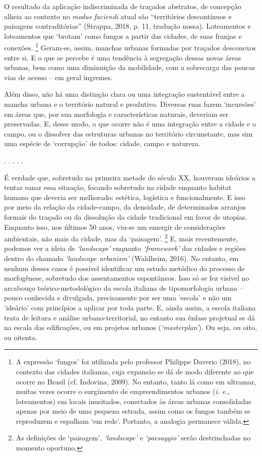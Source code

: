 \documentclass[]{report}
\begin{document}
	O resultado da aplicação indiscriminada de traçados abstratos, de concepção alheia ao contexto no \textit{modus faciendi} atual são ``territórios descontínuos e paisagens contraditórias'' (Strappa, 2018, p. 11, tradução nossa). Loteamentos e loteamentos que `brotam' como fungos a partir das cidades, de suas franjas e conexões.
		\footnote[5]{A expressão `fungos' foi utilizada pelo professor Philippe Daverio (2018), no contexto das cidades italianas, cuja expansão se dá de modo diferente ao que ocorre no Brasil (cf. Indovina, 2009). No entanto, tanto lá como em ultramar, muitas vezes ocorre o surgimento de empreendimentos urbanos (\textit{i. e.,} loteamentos) em locais inusitados, conectados às áreas urbanas consolidadas apenas por meio de uma pequena estrada, assim como os fungos também se reproduzem e espalham `em rede'. Portanto, a analogia permanece válida.} 
	Geram-se, assim, manchas urbanas formadas por traçados desconexos entre si. E o que se percebe é uma tendência à segregação dessas novas áreas urbanas, bem como uma diminuição da mobilidade, com a sobrecarga das poucas vias de acesso – em geral íngremes.

	Além disso, não há uma distinção clara ou uma integração sustentável entre a mancha urbana e o território natural e produtivo. Diversas ruas fazem `incursões' em áreas que, por sua morfologia e características naturais, deveriam ser preservadas. E, desse modo, o que ocorre não é uma integração entre a cidade e o campo, ou o dissolver das estruturas urbanas no território circunstante, mas sim uma espécie de `corrupção' de todos: cidade, campo e natureza.

	\begin{center}
		. . . . . 
	\end{center}

	É verdade que, sobretudo na primeira metade do século XX, houveram ideários a tentar sanar essa situação, focando sobretudo na cidade enquanto habitat humano que deveria ser melhorado: estética, logística e funcionalmente. E isso por meio da relação da cidade-campo, da densidade, de determinados arranjos formais do traçado ou da dissolução da cidade tradicional em favor de utopias. Enquanto isso, nos últimos 50 anos, viu-se um emergir de considerações ambientais, não mais da cidade, mas da `paisagem'.
		\footnote[6]{As definições de `paisagem', \textit{`landscape'} e \textit{`paesaggio'} serão destrinchadas no momento oportuno.} 
	E, mais recentemente, podemos ver a ideia de \textit{`landscape'} enquanto \textit{`framework'} das cidades e regiões dentro do chamado \textit{`landscape urbanism'} (Waldheim, 2016). No entanto, em nenhum desses casos é possível identificar um estudo metódico do processo de morfogênese, sobretudo dos assentamentos espontâneos. Isso só se fez visível no arcabouço teórico-metodológico da escola italiana de tipomorfologia urbana – pouco conhecida e divulgada, precisamente por ser uma 'escola' e não um 'ideário' com princípios a aplicar por toda parte. E, ainda assim, a escola italiana trata de leitura e análise urbano-territorial, no entanto sua ênfase projetual se dá na escala das edificações, ou em projetos urbanos (\textit{`masterplan'}). Ou seja, ou oito, ou oitenta.
\end{document}
